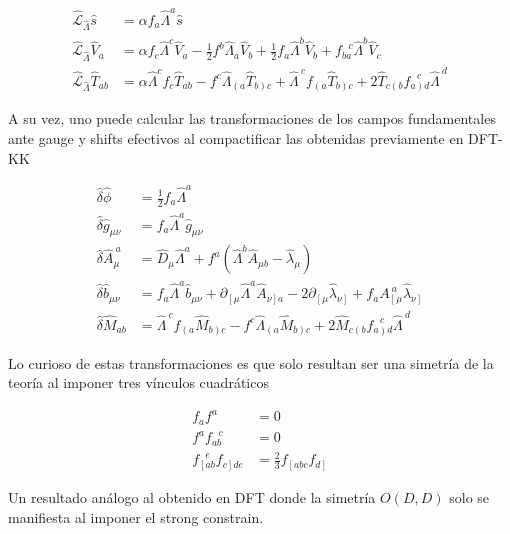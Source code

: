 \documentclass{article}
\numberwithin{equation}{section}
\begin{document}
\begin{boxumen}
	\begin{equation}
	\begin{aligned}
	\hat{\mathcal{L}}_{\hat{\Lambda}} \hat{s} &= \alpha f_a \hat{\Lambda}^a \hat{s}\\
	\hat{\mathcal{L}}_{\hat{\Lambda}} \hat{V}_a &= \alpha f_c \hat{\Lambda}^c \hat{V}_{a} - \frac{1}{2}f^b \hat{\Lambda}_a \hat{V}_b + \frac{1}{2} f_a \hat{\Lambda}^b \hat{V}_b + f_{b a}^{\ \ \ c} \hat{\Lambda}^b \hat{V}_{c} \\
	\hat{\mathcal{L}}_{\hat{\Lambda}} \hat{T}_{a b}&= \alpha \hat{\Lambda}^c f_c \hat{T}_{a b} - f^c \hat{\Lambda}_{\left( a\right.} \hat{T}_{\left. b\right) c} + \hat{\Lambda}^{\ c} f_{\left( a \right.}\hat{T}_{\left. b\right) c}  + 2 \hat{T}_{c \left( b\right.}f_{\left. a\right) d}^{\ \ \  c} \hat{\Lambda}^{\ d}
	\end{aligned}
	\end{equation}
	
	A su vez, uno puede calcular las transformaciones de los campos fundamentales ante gauge y shifts efectivos al compactificar las obtenidas previamente en DFT-KK
	
	
	\begin{equation}
	\begin{aligned}
	\hat{\delta} \hat{\phi} &= \frac{1}{2} f_a \hat{\Lambda}^a\\
	\hat{\delta} \hat{g}_{\mu \nu} &= f_a \hat{\Lambda}^a \hat{g}_{\mu \nu}\\
	\hat{\delta} \hat{A}_{\mu}^{\ a} &= \hat{D}_{\mu}\hat{\Lambda}^a + f^a \left(\hat{\Lambda}^b \hat{A}_{\mu b} - \hat{\lambda}_{\mu}\right)\\
	\hat{\delta} \hat{b}_{\mu \nu} &= f_a \hat{\Lambda}^a \hat{b}_{\mu \nu} + \partial_{\left[ \mu\right.} \hat{\Lambda}^a \hat{A}_{\left. \nu \right] a} -2 \partial_{\left[ \mu\right.} \hat{\lambda}_{\left. \nu \right]} + f_a A_{\left[ \mu\right.}^{\ a} \hat{\lambda}_{\left. \nu \right]}\\
	\hat{\delta} \hat{M}_{a b} &= \hat{\Lambda}^{\ c} f_{\left( a \right.}\hat{M}_{\left. b\right) c} - f^c \hat{\Lambda}_{\left( a\right.} \hat{M}_{\left. b\right) c} + 2 \hat{M}_{c \left( b\right.}f_{\left. a\right) d}^{\ \ \  c} \hat{\Lambda}^{\ d}
	\end{aligned}
	\end{equation}
	
	Lo curioso de estas transformaciones es que solo resultan ser una simetría de la teoría al imponer tres vínculos cuadráticos 
	
	\begin{equation}
	\begin{aligned}
	f_a f^a &=0\\
	f^a f_{a b}^{\ \ \ c} &=0\\
	f_{\left[a b\right.}^{\ \ \ e} f_{\left. c\right] d e} &= \frac{2}{3} f_{\left[ a b c\right.} f_{\left.d\right]}
	\end{aligned}
	\end{equation}
	
	Un resultado análogo al obtenido en DFT donde la simetría $ O(D,D) $ solo se manifiesta al imponer el strong constrain. 
	
\end{boxumen}
 
 
 
\end{document}
